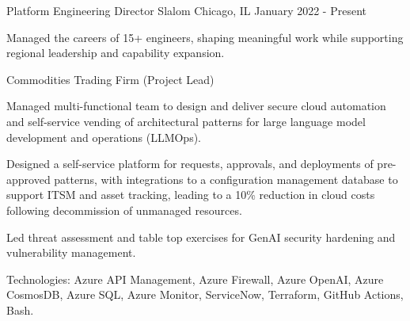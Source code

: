 

\begin{cventries}

  \cventry
    {Platform Engineering Director} %
    {Slalom} %
    {Chicago, IL} %
    {January 2022 - Present} %
    {
      \begin{cvitems} %
        \item {Managed the careers of 15+ engineers, shaping meaningful work while supporting regional leadership and capability expansion.}
      \end{cvitems}
    }

  \cventry
    {Commodities Trading Firm (Project Lead)} %
    {} %
    {} %
    {} %
    {
      \begin{cvitems} %
        \item {Managed multi-functional team to design and deliver secure cloud automation and self-service vending of architectural patterns for large language model development and operations (LLMOps).}
        \item {Designed a self-service platform for requests, approvals, and deployments of pre-approved patterns, with integrations to a configuration management database to support ITSM and asset tracking, leading to a 10\% reduction in cloud costs following decommission of unmanaged resources.}
        \item {Led threat assessment and table top exercises for GenAI security hardening and vulnerability management.}
        \item {Technologies: Azure API Management, Azure Firewall, Azure OpenAI, Azure CosmosDB, Azure SQL, Azure Monitor, ServiceNow, Terraform, GitHub Actions, Bash.}
      \end{cvitems}
    }


\end{cventries}
